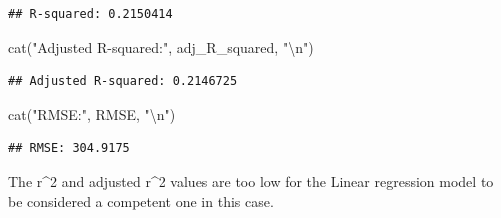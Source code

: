 \documentclass[
]{article}
\newenvironment{Shaded}{\begin{snugshade}}{\end{snugshade}}
\newcommand{\FunctionTok}[1]{\textcolor[rgb]{0.00,0.00,0.00}{#1}}
\newcommand{\NormalTok}[1]{#1}
\newcommand{\SpecialCharTok}[1]{\textcolor[rgb]{0.00,0.00,0.00}{#1}}
\newcommand{\StringTok}[1]{\textcolor[rgb]{0.31,0.60,0.02}{#1}}
\begin{document}
\begin{verbatim}
## R-squared: 0.2150414
\end{verbatim}

\begin{Shaded}
\begin{Highlighting}[]
\FunctionTok{cat}\NormalTok{(}\StringTok{"Adjusted R{-}squared:"}\NormalTok{, adj\_R\_squared, }\StringTok{"}\SpecialCharTok{\textbackslash{}n}\StringTok{"}\NormalTok{)}
\end{Highlighting}
\end{Shaded}

\begin{verbatim}
## Adjusted R-squared: 0.2146725
\end{verbatim}

\begin{Shaded}
\begin{Highlighting}[]
\FunctionTok{cat}\NormalTok{(}\StringTok{"RMSE:"}\NormalTok{, RMSE, }\StringTok{"}\SpecialCharTok{\textbackslash{}n}\StringTok{"}\NormalTok{)}
\end{Highlighting}
\end{Shaded}

\begin{verbatim}
## RMSE: 304.9175
\end{verbatim}

The r\^{}2 and adjusted r\^{}2 values are too low for the Linear
regression model to be considered a competent one in this case.
\end{document}
